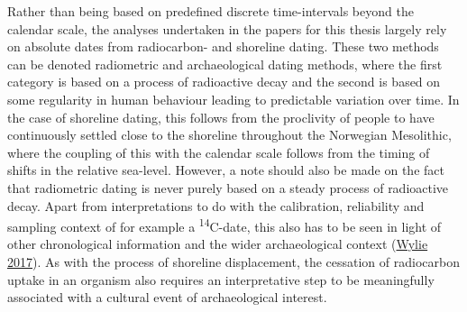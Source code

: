 \documentclass[
  a4paper,
  oneside]{uiophdthesis}
\begin{document}
Rather than being based on predefined discrete time-intervals beyond the calendar scale, the analyses undertaken in the papers for this thesis largely rely on absolute dates from radiocarbon- and shoreline dating. These two methods can be denoted radiometric and archaeological dating methods, where the first category is based on a process of radioactive decay and the second is based on some regularity in human behaviour leading to predictable variation over time. In the case of shoreline dating, this follows from the proclivity of people to have continuously settled close to the shoreline throughout the Norwegian Mesolithic, where the coupling of this with the calendar scale follows from the timing of shifts in the relative sea-level. However, a note should also be made on the fact that radiometric dating is never purely based on a steady process of radioactive decay. Apart from interpretations to do with the calibration, reliability and sampling context of for example a \textsuperscript{14}C-date, this also has to be seen in light of other chronological information and the wider archaeological context (\protect\hyperlink{ref-wylie2017}{Wylie 2017}). As with the process of shoreline displacement, the cessation of radiocarbon uptake in an organism also requires an interpretative step to be meaningfully associated with a cultural event of archaeological interest.
\end{document}
